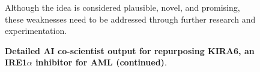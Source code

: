 \begin{figure}[htbp!]
\begin{tcolorbox}[
    colback=black!5!white,
    colframe=black!60!white,
    title=\textbf{KIRA6 for AML (continued)},
    fonttitle=\bfseries,
    arc=3mm,
    boxrule=1pt,
    bottomrule=2pt,
]
Although the idea is considered plausible, novel, and promising, these weaknesses need to be addressed through further research and experimentation.

\end{tcolorbox}
\vspace{0.1cm}
\caption{\textbf{Detailed AI co-scientist output for repurposing KIRA6, an IRE1$\alpha$ inhibitor for AML (continued)}.}
\label{fig:ex_kira6_8}
\end{figure}